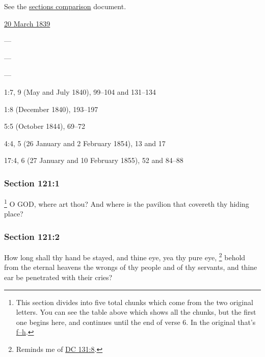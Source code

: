 		See the \href{https://drive.google.com/file/d/1goAvNz8jS4R8slYfMG_db55Ty2z_vmgK/view?usp=sharing}{sections comparison} document.
	
		\begin{compactdesc}
			\item[JSP] \hyperref[EMS-1839-JS-20-MAR-1839]{20 March 1839}
			\item[BC] ---
			\item[DC 1835] ---
			\item[DC 1844] ---
			\item[TS] 1:7, 9 (May and July 1840), 99--104 and 131--134
			\item[MS] 1:8 (December 1840), 193--197
			\item[MS] 5:5 (October 1844), 69--72
			\item[DN] 4:4, 5 (26 January and 2 February 1854), 13 and 17
			\item[MS] 17:4, 6 (27 January and 10 February 1855), 52 and 84--88
		\end{compactdesc}
	
	\subsubsection{Section 121:1} %
		\label{DC121-1}

			\footnote{%
				This section divides into five total chunks which come from the two original letters. You can see the table above which shows all the chunks, but the first one begins here, and continues until the end of verse 6. In the original that's \hyperlink{EMS-1839-JS-20-MAR-1839-f}{f--h}.
				}%
		O GOD, where art thou?  And where is the pavilion that covereth thy hiding place?


	\subsubsection{Section 121:2} %
		\label{DC121-2}

		How long shall thy hand be stayed, and thine eye, yea thy pure eye,%
			\footnote{%
				Reminds me of \hyperref[DC131-8]{DC 131:8}.
				}
		behold from the eternal heavens the wrongs of thy people and of thy servants, and thine ear be penetrated with their cries?

